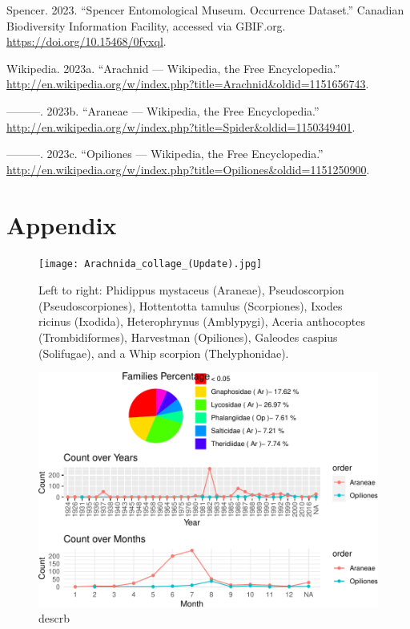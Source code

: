 \documentclass{article}
\newlength{\cslhangindent}
\newlength{\cslentryspacingunit} %
\newenvironment{CSLReferences}[2] %
 {%
  \setlength{\parindent}{0pt}
  \ifodd #1
  \let\oldpar\par
  \def\par{\hangindent=\cslhangindent\oldpar}
  \fi
  \setlength{\parskip}{#2\cslentryspacingunit}
 }%
 {}
\begin{document}
\hypertarget{refs}{}
\begin{CSLReferences}{1}{0}
\leavevmode{}%
Spencer. 2023. {``Spencer Entomological Museum. Occurrence Dataset.''}
Canadian Biodiversity Information Facility, accessed via GBIF.org.
\url{https://doi.org/10.15468/0fyxql}.

\leavevmode{}%
Wikipedia. 2023a. {``{Arachnid} --- {W}ikipedia{,} the Free
Encyclopedia.''}
\url{http://en.wikipedia.org/w/index.php?title=Arachnid\&oldid=1151656743}.

\leavevmode{}%
---------. 2023b. {``{Araneae} --- {W}ikipedia{,} the Free
Encyclopedia.''}
\url{http://en.wikipedia.org/w/index.php?title=Spider\&oldid=1150349401}.

\leavevmode{}%
---------. 2023c. {``{Opiliones} --- {W}ikipedia{,} the Free
Encyclopedia.''}
\url{http://en.wikipedia.org/w/index.php?title=Opiliones\&oldid=1151250900}.

\end{CSLReferences}

\hypertarget{appendix}{%
\section*{Appendix}\label{appendix}}

\newpage

\begin{figure}
  \centering
  \texttt{[image: Arachnida\_collage\_(Update).jpg]}
  \caption{Left to right: Phidippus mystaceus (Araneae), Pseudoscorpion (Pseudoscorpiones), Hottentotta tamulus (Scorpiones), Ixodes ricinus (Ixodida), Heterophrynus (Amblypygi), Aceria anthocoptes (Trombidiformes), Harvestman (Opiliones), Galeodes caspius (Solifugae), and a Whip scorpion (Thelyphonidae).}
  \label{fig:fig1}
\end{figure}

\begin{figure}
\centering
\includegraphics{Arachnida_files/figure-latex/groups.fig-1.pdf}
\caption{\label{fig:descrb}descrb}
\end{figure}
\end{document}
